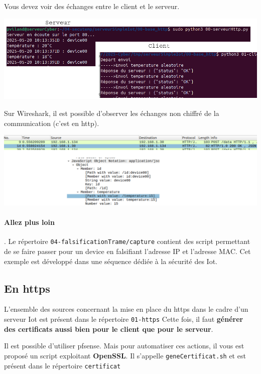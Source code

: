 \documentclass[french, 12pt]{article}%
\begin{document}
Vous devez voir des échanges entre le client et le serveur.
\begin{center}
\includegraphics[scale=0.5]{./ressource/exServeurIotHttp}
\end{center}

Sur Wireshark, il est possible d'observer les échanges non chiffré de la communication (c'est en http). 
\begin{center}
\includegraphics[scale=0.4]{./ressource/resWireshark}
\end{center}

\paragraph{Allez plus loin}. Le répertoire \verb?04-falsificationTrame/capture? contient des script permettant de se faire passer pour un device en falsifiant l'adresse IP et l'adresse MAC. Cet exemple est développé dans une séquence dédiée à la sécurité des Iot.

\subsection{En https}

L'ensemble des sources concernant la mise en place du https dans le cadre d'un serveur Iot est présent dans le répertoire \verb?01-https? Cette fois, il faut \textbf{générer des certificats aussi bien pour le client que pour le serveur}.

\vspace{0.5cm}
Il est possible d'utiliser pfsense. Mais pour automatiser ces actions, il vous est proposé un script exploitant  \textbf{OpenSSL}. Il s'appelle \verb?geneCertificat.sh? et est présent dans le répertoire \verb?certificat?
\end{document}
